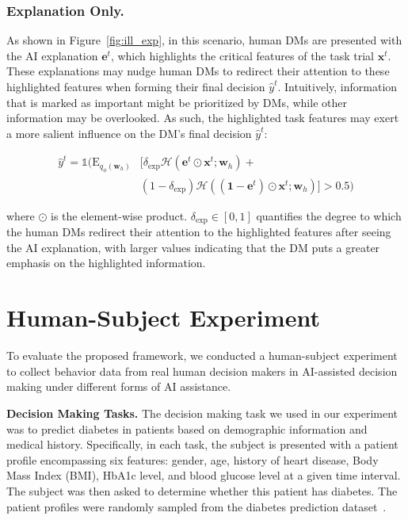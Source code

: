 \documentclass[letterpaper]{article} %
\newcommand{\my}[1]{\textcolor{blue}{[Ming: #1]}}
\newcommand{\zy}[1]{\textcolor{red}{[Zhuoyan: #1]}}
\begin{document}
\subsubsection{Explanation Only.}
As shown in Figure~\ref{fig:ill_exp}, in this scenario, human DMs are  presented with the AI explanation $\bm{e}^{t}$, which highlights the critical features of the task trial $\bm{x}^t$. These explanations may nudge human DMs to redirect their attention to these highlighted features when forming their final decision $\hat{y}^t$. Intuitively, information that is marked as important might be prioritized by DMs, while other information may be overlooked. As such, the highlighted task features may exert a more salient influence on the DM's final decision $\hat{y}^t$:
\begin{small}
\begin{equation}
\begin{split}
    \hat{y}^{t} = \mathds{1}(\mathrm{E}_{q_{\phi}(\bm{w}_h)} & [\delta_{\text{exp}} \mathcal{H}(\bm{e}^t \odot \boldsymbol{x}^t;\bm{w}_h) + \\
    &(1-\delta_{\text{exp}})\mathcal{H}((\bm{1}-\bm{e}^t) \odot \boldsymbol{x}^t;\bm{w}_h)]>0.5)
\end{split}
\end{equation}
\end{small}
\noindent where $\odot$ is the element-wise product. $\delta_{\text{exp}} \in [0,1]$ quantifies the degree to which the human DMs redirect their attention to the highlighted features after seeing the AI explanation,
with larger values
indicating that the DM puts a greater emphasis on the highlighted information.





\section{Human-Subject Experiment}
To evaluate the proposed framework,
we conducted a human-subject experiment to collect behavior data from real human decision makers in AI-assisted decision making under different forms of AI assistance.

\noindent \textbf{Decision Making Tasks.} The decision making task we used in our experiment was to predict diabetes in patients based on demographic information and medical history. Specifically, in each task, the subject is presented with a patient profile encompassing six features: gender, age, history of heart disease, Body Mass Index (BMI), HbA1c level, and blood glucose level at a given time interval. The subject was then asked to determine whether this patient has diabetes. The patient profiles were randomly sampled from the diabetes prediction dataset~\cite{mustafaz_dia}.
\end{document}
